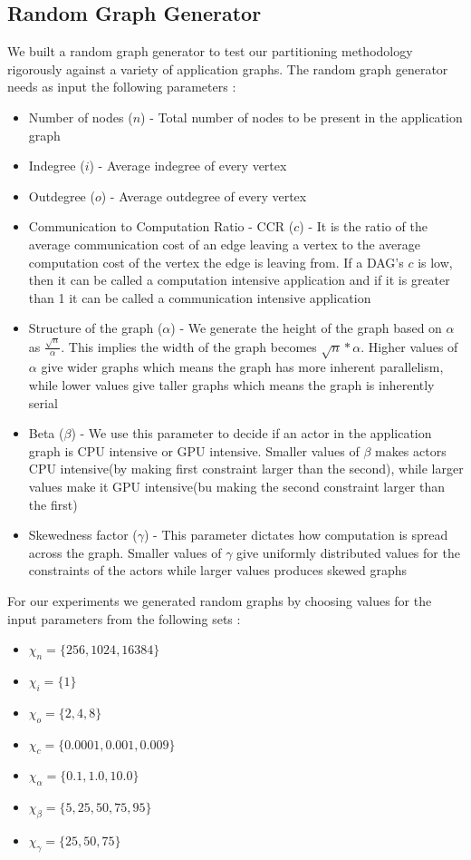 \subsection{Random Graph Generator}
\label{sec:rand-graph-generator}
We built a random graph generator to test our partitioning methodology
rigorously against a variety of application graphs. The random graph generator
needs as input the following parameters :

\begin{itemize}
\item Number of nodes ($n$) - Total number of nodes to be present in the
application graph
\item Indegree ($i$) - Average indegree of every vertex
\item Outdegree ($o$) - Average outdegree of every vertex
\item Communication to Computation Ratio - CCR ($c$) - It is the ratio
of the average communication cost of an edge leaving a vertex to the average
computation cost of the vertex the edge is leaving from. If a DAG's
$c$ is low, then it can be called a computation intensive application
and if it is greater than 1 it can be called a communication intensive
application
\item Structure of the graph ($\alpha$) - We
generate the height of the graph based on $\alpha$ as
$\frac{\sqrt{n}}{\alpha}$. This implies the width of the graph becomes
$\sqrt{n}*{\alpha}$. Higher values of $\alpha$ give wider graphs which
means the graph has more inherent parallelism, while lower values give taller
graphs which means the graph is inherently serial
\item Beta ($\beta$) - We use this parameter to decide if an actor in the
application graph is CPU intensive or GPU intensive. Smaller values of $\beta$
makes actors CPU intensive(by making first constraint larger than the second),
while larger values make it GPU intensive(bu making the second constraint larger
than the first)
\item Skewedness factor ($\gamma$) - This parameter dictates how computation is
spread across the graph. Smaller values of $\gamma$ give uniformly distributed
values for the constraints of the actors while larger values produces skewed
graphs
\end{itemize}

For our experiments we generated random graphs by choosing values for the input
parameters from the following sets :

\begin{itemize}
\item $\chi_{n} = \{256, 1024, 16384\}$
\item $\chi_{i} = \{1\}$
\item $\chi_{o} = \{2, 4, 8\}$
\item $\chi_{c} = \{0.0001, 0.001, 0.009\}$
\item $\chi_{\alpha} = \{0.1, 1.0, 10.0\}$
\item $\chi_{\beta} = \{5, 25, 50, 75, 95\}$
\item $\chi_{\gamma} = \{25, 50, 75\}$
\end{itemize}

